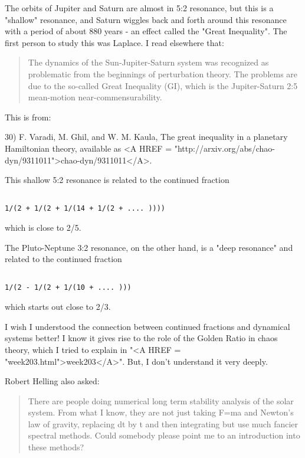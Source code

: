 The orbits of Jupiter and Saturn are almost in 5:2 resonance, but 
this is a "shallow" resonance, and Saturn wiggles back and forth 
around this resonance with a period of about 880 years - an effect 
called the "Great Inequality".  The first person to study this was
Laplace.  I read elsewhere that:

\begin{quote}
 The dynamics of the Sun-Jupiter-Saturn system was recognized
 as problematic from the beginnings of perturbation theory.  
 The problems are due to the so-called Great Inequality (GI), which
 is the Jupiter-Saturn 2:5 mean-motion near-commensurability.
\end{quote}

This is from: 

30) F. Varadi, M. Ghil, and W. M. Kaula, The great inequality in a 
planetary Hamiltonian theory, available as 
<A HREF = "http://arxiv.org/abs/chao-dyn/9311011">chao-dyn/9311011</A>.

This shallow 5:2 resonance is related to the continued fraction


\begin{verbatim}

1/(2 + 1/(2 + 1/(14 + 1/(2 + .... ))))
\end{verbatim}
    
which is close to 2/5.

The Pluto-Neptune 3:2 resonance, on the other hand, is a 
"deep resonance"
and related to the continued fraction


\begin{verbatim}

1/(2 - 1/(2 + 1/(10 + .... )))
\end{verbatim}
    
which starts out close to 2/3.  

I wish I understood the connection between continued fractions and
dynamical systems better!  I know it gives rise to the role of the 
Golden Ratio in chaos theory, which I tried to explain in "<A HREF =
"week203.html">week203</A>".
But, I don't understand it very deeply.

Robert Helling also asked:

\begin{quote}
There are people doing numerical long term stability
analysis of the solar system. From what I know, they are not just
taking F=ma and Newton's law of gravity, replacing dt by \Delta t and
then integrating but use much fancier spectral methods. Could somebody
please point me to an introduction into these methods?
\end{quote}

